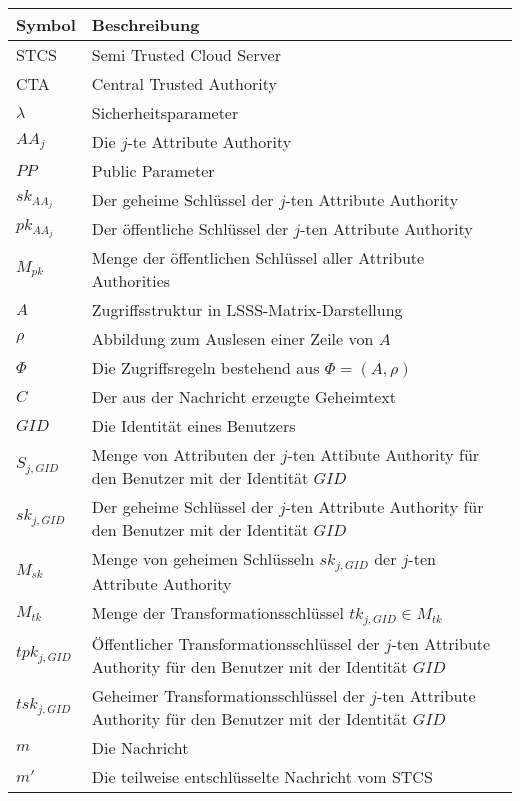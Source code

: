 \begin{center}
	\begin{small}
		\begin{tabular}{p{3cm}p{9cm}}
			\hline
			Symbol & Beschreibung \\
			\hline
			STCS & Semi Trusted Cloud Server \\
			CTA & Central Trusted Authority \\
			$\lambda$ & Sicherheitsparameter \\
			$AA_j$ & Die $j$-te Attribute Authority \\
			$PP$ & Public Parameter \\
			$sk_{AA_j}$ & Der geheime Schlüssel der $j$-ten Attribute Authority \\
			$pk_{AA_j}$ & Der öffentliche Schlüssel der $j$-ten Attribute Authority \\
			$M_{pk}$ & Menge der öffentlichen Schlüssel aller Attribute Authorities \\
			$A$ & Zugriffsstruktur in LSSS-Matrix-Darstellung \\
			$\rho$ & Abbildung zum Auslesen einer Zeile von $A$ \\
			$\Phi$ & Die Zugriffsregeln bestehend aus $\Phi = \left(A, \rho\right)$ \\
			$C$ & Der aus der Nachricht erzeugte Geheimtext \\
			$GID$ & Die Identität eines Benutzers \\
			$S_{j, GID}$ & Menge von Attributen der $j$-ten Attibute Authority für den
			Benutzer mit der Identität $GID$ \\
			$sk_{j, GID}$ & Der geheime Schlüssel der $j$-ten Attribute Authority für
			den Benutzer mit der Identität $GID$ \\
			$M_{sk}$ & Menge von geheimen Schlüsseln $sk_{j, GID}$ der $j$-ten Attribute
			Authority \\
			$M_{tk}$ & Menge der Transformationsschlüssel $tk_{j, GID} \in M_{tk}$ \\
			$tpk_{j, GID}$ & Öffentlicher Transformationsschlüssel der $j$-ten
			Attribute Authority für den Benutzer mit der Identität $GID$ \\
			$tsk_{j, GID}$ & Geheimer Transformationsschlüssel der $j$-ten
			Attribute Authority für den Benutzer mit der Identität $GID$ \\
			$m$ & Die Nachricht \\
			$m'$ & Die teilweise entschlüsselte Nachricht vom STCS \\
			\hline
		\end{tabular}
	\end{small}
\end{center}
